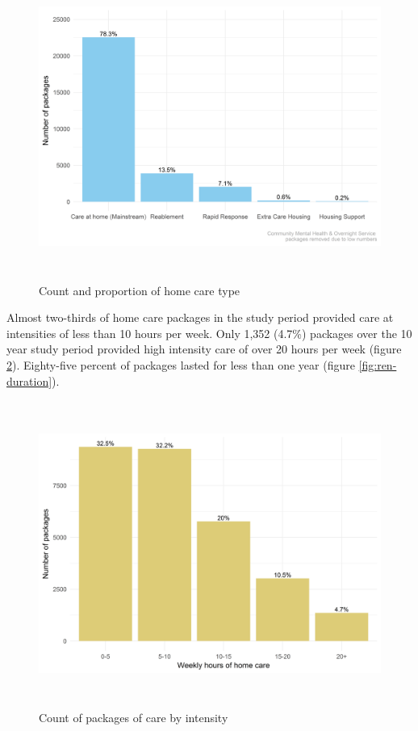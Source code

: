 \documentclass[]{article}
\begin{document}
\begin{figure}[]
  \centering
    \includegraphics[height = 10cm]{figures/chapter-renf/03-pack-plot}
    \caption{Count and proportion of home care type}
    \label{fig:ren-type}
\end{figure}

Almost two-thirds of home care packages in the study period provided
care at intensities of less than 10 hours per week. Only 1,352 (4.7\%)
packages over the 10 year study period provided high intensity care of
over 20 hours per week (figure \ref{fig:ren-hrs}). Eighty-five percent
of packages lasted for less than one year (figure
\ref{fig:ren-duration}).

\begin{figure}[]
  \centering
    \includegraphics[height = 10cm]{figures/chapter-renf/04-hrs-plot-ts-subset.png}
    \caption{Count of packages of care by intensity}
    \label{fig:ren-hrs}
\end{figure}
\end{document}
